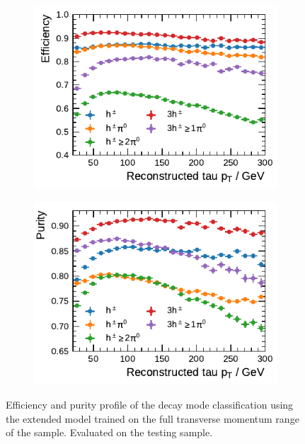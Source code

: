 \begin{figure}[htb]
  \begin{subfigure}{0.48\textwidth}
    \centering
    \includegraphics{./figures/decay_mode_classification/highpt/efficiency_profile_extended.pdf}
  \end{subfigure}\hfill
  \begin{subfigure}{0.48\textwidth}
    \centering
    \includegraphics{./figures/decay_mode_classification/highpt/purity_profile_extended.pdf}
  \end{subfigure}
  \caption[Efficiency and purity profiles of the extended model for decay mode
  classification (trained on the full momentum range)]{Efficiency and purity
    profile of the decay mode classification using the extended model trained on
    the full transverse momentum range of the sample. Evaluated on the testing
    sample.}
  \label{fig:mode_efficiency_purity_highpt}
\end{figure}

